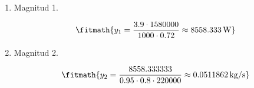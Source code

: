 \begin{enumerate}

\item Magnitud 1.

\[\fitmath{y_{1}=\frac{3.9\cdot 1580000}{1000\cdot 0.72}\approx 8558.333\,\mathrm{W}}\]

\item Magnitud 2.

\[\fitmath{y_{2}=\frac{8558.333333}{0.95\cdot 0.8\cdot 220000}\approx 0.0511862\,\mathrm{kg/s}}\]

\end{enumerate}
